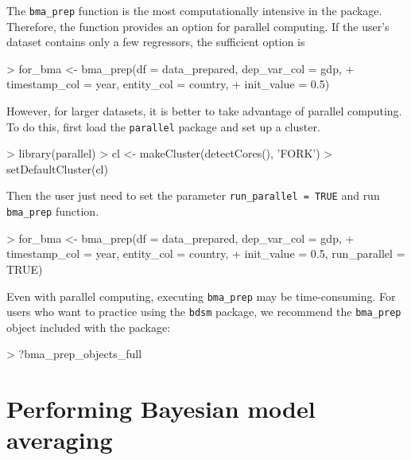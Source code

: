 \documentclass[a4paper]{article}
\begin{document}
The \verb+bma_prep+ function is the most computationally intensive in the package. Therefore, the function provides an option for parallel computing. If the user's dataset contains only a few regressors, the sufficient option is
\begin{Schunk}
\begin{Sinput}
> for_bma <- bma_prep(df = data_prepared, dep_var_col = gdp,
+                    timestamp_col = year, entity_col = country,
+                    init_value = 0.5)
\end{Sinput}
\end{Schunk}
However, for larger datasets, it is better to take advantage of parallel computing. To do this, first load the \verb+parallel+ package and set up a cluster.
\begin{Schunk}
\begin{Sinput}
> library(parallel)
> cl <- makeCluster(detectCores(), 'FORK')
> setDefaultCluster(cl)
\end{Sinput}
\end{Schunk}
Then the user just need to set the parameter \verb+run_parallel = TRUE+ and run \verb+bma_prep+ function.
\begin{Schunk}
\begin{Sinput}
> for_bma <- bma_prep(df = data_prepared, dep_var_col = gdp,
+                    timestamp_col = year, entity_col = country,
+                    init_value = 0.5, run_parallel = TRUE)
\end{Sinput}
\end{Schunk}
Even with parallel computing, executing \verb+bma_prep+ may be time-consuming. For users who want to practice using the \verb+bdsm+ package, we recommend the \verb+bma_prep+ object included with the package:
\begin{Schunk}
\begin{Sinput}
> ?bma_prep_objects_full
\end{Sinput}
\end{Schunk}

\section{Performing Bayesian model averaging}\label{using_bma}
\end{document}

